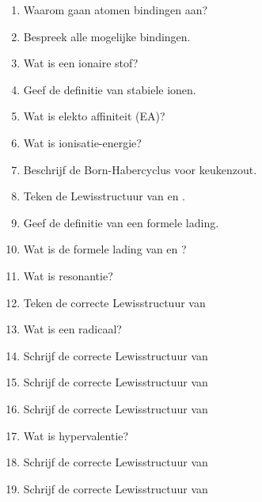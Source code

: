 \documentclass[a4paper,12pt]{article}
\begin{document}
    \begin{enumerate}
        \item Waarom gaan atomen bindingen aan?
        \item Bespreek alle mogelijke bindingen.
        \item Wat is een ionaire stof?
        \item Geef de definitie van stabiele ionen.
        \item Wat is elekto affiniteit (EA)?
        \item Wat is ionisatie-energie?
        \item Beschrijf de Born-Habercyclus voor keukenzout.
        \item Teken de Lewisstructuur van  en .
        \item Geef de definitie van een formele lading.
        \item Wat is de formele lading van  en ?
        \item Wat is resonantie?
        \item Teken de correcte Lewisstructuur van 
        \item Wat is een radicaal?
        \item Schrijf de correcte Lewisstructuur van 
        \item Schrijf de correcte Lewisstructuur van 
        \item Schrijf de correcte Lewisstructuur van 
        \item Wat is hypervalentie?
        \item Schrijf de correcte Lewisstructuur van 
        \item Schrijf de correcte Lewisstructuur van 
    \end{enumerate}
\end{document}
